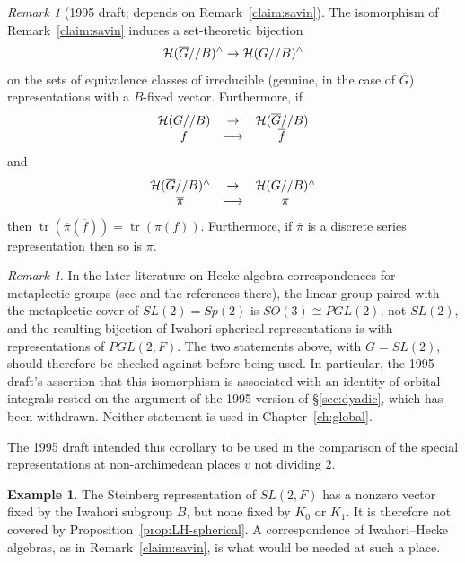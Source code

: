 \documentclass[12pt,letterpaper]{book}
\theoremstyle{plain}
\theoremstyle{definition}
\newtheorem{example}[theorem]{Example}
\theoremstyle{remark}
\newtheorem{remark}[theorem]{Remark}
\theoremstyle{remark}
\newtheorem{remyy}{Remark}
\newcommand{\tr}{\operatorname{tr}}
\begin{document}
\begin{remyy}[1995 draft; depends on Remark~\ref{claim:savin}]
The isomorphism of Remark~\ref{claim:savin}
induces a set-theoretic bijection
\[
{\cal H}(\overline{G}//B)^\wedge\rightarrow {\cal H}(G//B)^\wedge
\]
on the sets of equivalence
classes of irreducible (genuine, in the case of $\overline{G}$)
representations with a $B$-fixed vector.
Furthermore, if
\[
\begin{array}{ccc}
{\cal H}(G//B)&\rightarrow &{\cal H}(\overline{G}//B)\\
f & \longmapsto & \overline{f}
\end{array}
\]
and
\[
\begin{array}{ccc}
{\cal H}(\overline{G}//B)^\wedge &\rightarrow &{\cal H}(G//B)^\wedge\\
\overline{\pi}&\longmapsto &\pi
\end{array}
\]
then $\tr(\overline{\pi}(\overline{f}))=\tr(\pi(f))$.
Furthermore, if $\overline{\pi}$ is a discrete series representation
then so is $\pi$.
\end{remyy}

\begin{remark}\label{rem:savin-caveat}
In the later literature on Hecke algebra correspondences
for metaplectic groups (see \cite{TW} and the references there), the
linear group paired with the metaplectic cover of $SL(2)=Sp(2)$ is
$SO(3)\cong PGL(2)$, not $SL(2)$, and the resulting bijection of
Iwahori-spherical representations is with representations of $PGL(2,F)$.
The two statements above, with $G=SL(2)$, should therefore be
checked against \cite{Sav} before being used. In particular, the 1995
draft's assertion that this isomorphism is associated with an identity
of orbital integrals rested on the argument of the 1995 version of
\S\ref{sec:dyadic}, which has been withdrawn.
Neither statement is used in Chapter~\ref{ch:global}.
\end{remark}

The 1995 draft intended this corollary to be used in the comparison of
the special representations at non-archimedean places $v$ not dividing
$2$.



\begin{example}
The Steinberg representation of $SL(2,F)$ has a nonzero vector fixed by
the Iwahori subgroup $B$, but none fixed by $K_0$ or $K_1$. It is therefore
not covered by Proposition~\ref{prop:LH-spherical}. A correspondence of
Iwahori--Hecke algebras, as in Remark~\ref{claim:savin}, is what would be
needed at such a place.
\end{example}
\end{document}
